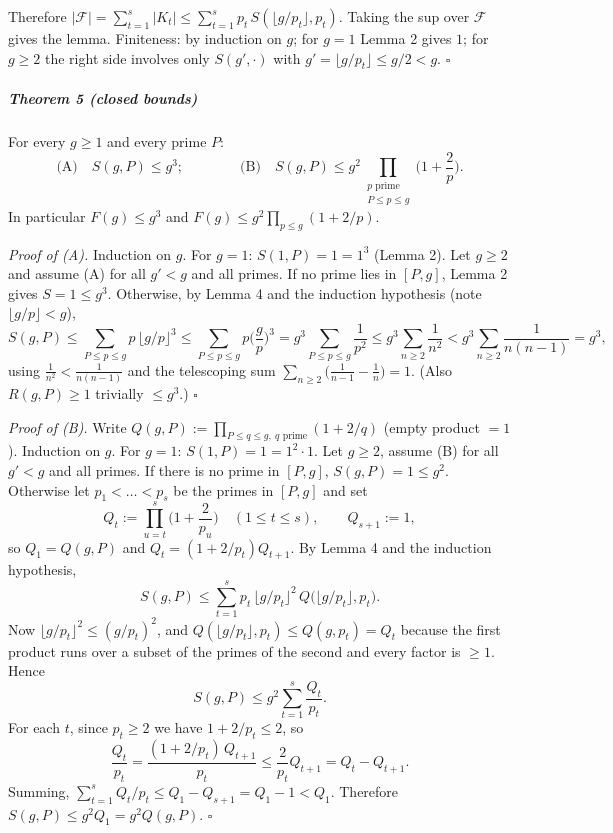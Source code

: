 \documentclass[11pt,a4paper]{article}
\begin{document}
Therefore
\(|\mathcal F|=\sum_{t=1}^{s}|K_t|\le\sum_{t=1}^{s}p_t\,S(\lfloor g/p_t\rfloor,p_t)\).
Taking the sup over \(\mathcal F\) gives the lemma. Finiteness: by
induction on \(g\); for \(g=1\) Lemma 2 gives \(1\); for \(g\ge2\) the
right side involves only \(S(g',\cdot)\) with
\(g'=\lfloor g/p_t\rfloor\le g/2<g\). \(\square\)

\subparagraph{Theorem 5 (closed bounds)}\label{theorem-5-closed-bounds}

For every \(g\ge1\) and every prime \(P\):
\[\text{(A)}\quad S(g,P)\le g^{3};\qquad\qquad \text{(B)}\quad S(g,P)\le g^{2}\prod_{\substack{p \text{ prime}\\ P\le p\le g}}\Big(1+\frac{2}{p}\Big).\]
In particular \(F(g)\le g^3\) and \(F(g)\le g^2\prod_{p\le g}(1+2/p)\).

\emph{Proof of (A).} Induction on \(g\). For \(g=1\): \(S(1,P)=1=1^3\)
(Lemma 2). Let \(g\ge2\) and assume (A) for all \(g'<g\) and all primes.
If no prime lies in \([P,g]\), Lemma 2 gives \(S=1\le g^3\). Otherwise,
by Lemma 4 and the induction hypothesis (note \(\lfloor g/p\rfloor<g\)),
\[S(g,P)\le\sum_{P\le p\le g}p\,\lfloor g/p\rfloor^{3}\le\sum_{P\le p\le g}p\Big(\frac gp\Big)^{3}=g^{3}\sum_{P\le p\le g}\frac1{p^{2}}\le g^{3}\sum_{n\ge2}\frac1{n^{2}}< g^{3}\sum_{n\ge2}\frac1{n(n-1)}=g^{3},\]
using \(\frac1{n^2}<\frac1{n(n-1)}\) and the telescoping sum
\(\sum_{n\ge2}\big(\frac1{n-1}-\frac1n\big)=1\). (Also \(R(g,P)\ge 1\)
trivially \(\le g^3\).) \(\square\)

\emph{Proof of (B).} Write
\(Q(g,P):=\prod_{P\le q\le g,\ q\text{ prime}}(1+2/q)\) (empty product
\(=1\)). Induction on \(g\). For \(g=1\): \(S(1,P)=1=1^2\cdot 1\). Let
\(g\ge2\), assume (B) for all \(g'<g\) and all primes. If there is no
prime in \([P,g]\), \(S(g,P)=1\le g^2\). Otherwise let \(p_1<\dots<p_s\)
be the primes in \([P,g]\) and set
\[Q_t:=\prod_{u=t}^{s}\Big(1+\frac2{p_u}\Big)\quad(1\le t\le s),\qquad Q_{s+1}:=1,\]
so \(Q_1=Q(g,P)\) and \(Q_t=(1+2/p_t)Q_{t+1}\). By Lemma 4 and the
induction hypothesis,
\[S(g,P)\le\sum_{t=1}^{s}p_t\,\lfloor g/p_t\rfloor^{2}\,Q\big(\lfloor g/p_t\rfloor,p_t\big).\]
Now \(\lfloor g/p_t\rfloor^2\le (g/p_t)^2\), and
\(Q(\lfloor g/p_t\rfloor,p_t)\le Q(g,p_t)=Q_t\) because the first
product runs over a subset of the primes of the second and every factor
is \(\ge1\). Hence \[S(g,P)\le g^{2}\sum_{t=1}^{s}\frac{Q_t}{p_t}.\] For
each \(t\), since \(p_t\ge2\) we have \(1+2/p_t\le 2\), so
\[\frac{Q_t}{p_t}=\frac{(1+2/p_t)\,Q_{t+1}}{p_t}\le\frac{2}{p_t}Q_{t+1}=Q_t-Q_{t+1}.\]
Summing, \(\sum_{t=1}^{s}Q_t/p_t\le Q_1-Q_{s+1}=Q_1-1<Q_1\). Therefore
\(S(g,P)\le g^2Q_1=g^2Q(g,P)\). \(\square\)
\end{document}
